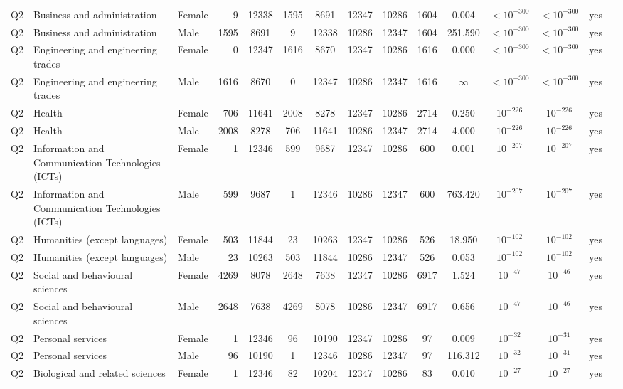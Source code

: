 \begin{longtable}{lllrcccccccccll}
Q2 & Business and administration & Female & 9 & 12338 & 1595 & 8691 & 12347 & 10286 & 1604 & 0.004 & $<10^{-300}$ & $<10^{-300}$ & yes \\
Q2 & Business and administration & Male & 1595 & 8691 & 9 & 12338 & 10286 & 12347 & 1604 & 251.590 & $<10^{-300}$ & $<10^{-300}$ & yes \\
Q2 & Engineering and engineering trades & Female & 0 & 12347 & 1616 & 8670 & 12347 & 10286 & 1616 & 0.000 & $<10^{-300}$ & $<10^{-300}$ & yes \\
Q2 & Engineering and engineering trades & Male & 1616 & 8670 & 0 & 12347 & 10286 & 12347 & 1616 & $\infty$ & $<10^{-300}$ & $<10^{-300}$ & yes \\
Q2 & Health & Female & 706 & 11641 & 2008 & 8278 & 12347 & 10286 & 2714 & 0.250 & $10^{-226}$ & $10^{-226}$ & yes \\
Q2 & Health & Male & 2008 & 8278 & 706 & 11641 & 10286 & 12347 & 2714 & 4.000 & $10^{-226}$ & $10^{-226}$ & yes \\
Q2 & Information and Communication Technologies (ICTs) & Female & 1 & 12346 & 599 & 9687 & 12347 & 10286 & 600 & 0.001 & $10^{-207}$ & $10^{-207}$ & yes \\
Q2 & Information and Communication Technologies (ICTs) & Male & 599 & 9687 & 1 & 12346 & 10286 & 12347 & 600 & 763.420 & $10^{-207}$ & $10^{-207}$ & yes \\
Q2 & Humanities (except languages) & Female & 503 & 11844 & 23 & 10263 & 12347 & 10286 & 526 & 18.950 & $10^{-102}$ & $10^{-102}$ & yes \\
Q2 & Humanities (except languages) & Male & 23 & 10263 & 503 & 11844 & 10286 & 12347 & 526 & 0.053 & $10^{-102}$ & $10^{-102}$ & yes \\
Q2 & Social and behavioural sciences & Female & 4269 & 8078 & 2648 & 7638 & 12347 & 10286 & 6917 & 1.524 & $10^{-47}$ & $10^{-46}$ & yes \\
Q2 & Social and behavioural sciences & Male & 2648 & 7638 & 4269 & 8078 & 10286 & 12347 & 6917 & 0.656 & $10^{-47}$ & $10^{-46}$ & yes \\
Q2 & Personal services & Female & 1 & 12346 & 96 & 10190 & 12347 & 10286 & 97 & 0.009 & $10^{-32}$ & $10^{-31}$ & yes \\
Q2 & Personal services & Male & 96 & 10190 & 1 & 12346 & 10286 & 12347 & 97 & 116.312 & $10^{-32}$ & $10^{-31}$ & yes \\
Q2 & Biological and related sciences & Female & 1 & 12346 & 82 & 10204 & 12347 & 10286 & 83 & 0.010 & $10^{-27}$ & $10^{-27}$ & yes \\

\end{longtable}
